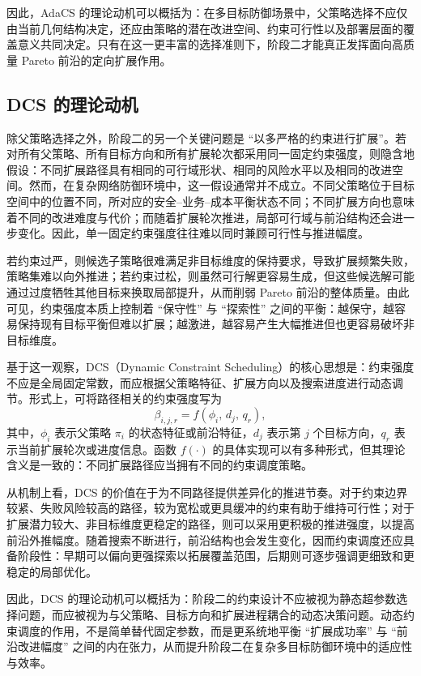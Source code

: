 \documentclass[12pt,a4paper]{article}
\begin{document}
因此，AdaCS 的理论动机可以概括为：在多目标防御场景中，父策略选择不应仅由当前几何结构决定，还应由策略的潜在改进空间、约束可行性以及部署层面的覆盖意义共同决定。只有在这一更丰富的选择准则下，阶段二才能真正发挥面向高质量 Pareto 前沿的定向扩展作用。

\subsection{DCS 的理论动机}

除父策略选择之外，阶段二的另一个关键问题是 ``以多严格的约束进行扩展''。若对所有父策略、所有目标方向和所有扩展轮次都采用同一固定约束强度，则隐含地假设：不同扩展路径具有相同的可行域形状、相同的风险水平以及相同的改进空间。然而，在复杂网络防御环境中，这一假设通常并不成立。不同父策略位于目标空间中的位置不同，所对应的安全--业务--成本平衡状态不同；不同扩展方向也意味着不同的改进难度与代价；而随着扩展轮次推进，局部可行域与前沿结构还会进一步变化。因此，单一固定约束强度往往难以同时兼顾可行性与推进幅度。

若约束过严，则候选子策略很难满足非目标维度的保持要求，导致扩展频繁失败，策略集难以向外推进；若约束过松，则虽然可行解更容易生成，但这些候选解可能通过过度牺牲其他目标来换取局部提升，从而削弱 Pareto 前沿的整体质量。由此可见，约束强度本质上控制着 ``保守性'' 与 ``探索性'' 之间的平衡：越保守，越容易保持现有目标平衡但难以扩展；越激进，越容易产生大幅推进但也更容易破坏非目标维度。

基于这一观察，DCS（Dynamic Constraint Scheduling）的核心思想是：约束强度不应是全局固定常数，而应根据父策略特征、扩展方向以及搜索进度进行动态调节。形式上，可将路径相关的约束强度写为
\begin{equation}
\beta_{i,j,r}
=
f\!\left(
\phi_i,\,
d_j,\,
q_r
\right),
\end{equation}
其中，$\phi_i$ 表示父策略 $\pi_i$ 的状态特征或前沿特征，$d_j$ 表示第 $j$ 个目标方向，$q_r$ 表示当前扩展轮次或进度信息。函数 $f(\cdot)$ 的具体实现可以有多种形式，但其理论含义是一致的：不同扩展路径应当拥有不同的约束调度策略。

从机制上看，DCS 的价值在于为不同路径提供差异化的推进节奏。对于约束边界较紧、失败风险较高的路径，较为宽松或更具缓冲的约束有助于维持可行性；对于扩展潜力较大、非目标维度更稳定的路径，则可以采用更积极的推进强度，以提高前沿外推幅度。随着搜索不断进行，前沿结构也会发生变化，因而约束调度还应具备阶段性：早期可以偏向更强探索以拓展覆盖范围，后期则可逐步强调更细致和更稳定的局部优化。

因此，DCS 的理论动机可以概括为：阶段二的约束设计不应被视为静态超参数选择问题，而应被视为与父策略、目标方向和扩展进程耦合的动态决策问题。动态约束调度的作用，不是简单替代固定参数，而是更系统地平衡 ``扩展成功率'' 与 ``前沿改进幅度'' 之间的内在张力，从而提升阶段二在复杂多目标防御环境中的适应性与效率。
\end{document}
